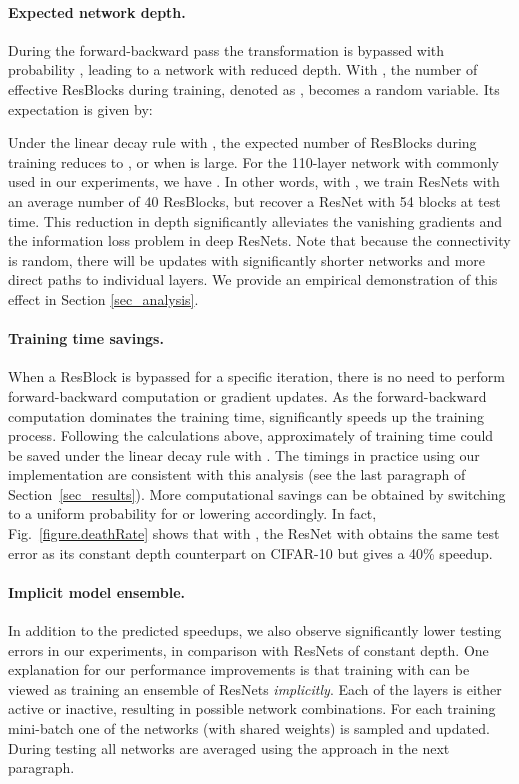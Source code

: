 \documentclass[runningheads]{llncs}
\begin{document}
\paragraph{\textbf{Expected network depth}.}
During the forward-backward pass the transformation  is bypassed with probability , leading to a network with reduced depth.
With \name{}, the number of effective ResBlocks during training, denoted as , becomes a random variable. Its expectation is given by:


Under the linear decay rule with , the expected number of ResBlocks during training reduces to , or  when  is large. For the 110-layer network with  commonly used in our experiments, we have . In other words, with \name{}, we train ResNets with an average number of 40 ResBlocks, but recover a ResNet with 54 blocks at test time.
This reduction in depth significantly alleviates the vanishing gradients and the information loss problem in deep ResNets. Note that because the connectivity is random, there will be updates with significantly shorter networks and more direct paths to individual layers. We provide an empirical demonstration of this effect in Section \ref{sec_analysis}.

\paragraph{\textbf{Training time savings}.}
When a ResBlock is bypassed for a specific iteration, there is no need to perform forward-backward computation or gradient updates. As the forward-backward computation dominates the training time, \name{} significantly speeds up the training process. Following the calculations above, approximately  of training time could be saved under the linear decay rule with . The timings in practice using our implementation are consistent with this analysis (see the last paragraph of Section~\ref{sec_results}). More computational savings can be obtained by switching to a uniform probability for  or lowering  accordingly. In fact, Fig.~\ref{figure.deathRate} shows that with , the ResNet with \name{} obtains the same test error as its constant depth counterpart on CIFAR-10 but gives a 40\% speedup.

\paragraph{\textbf{Implicit model ensemble}.}
In addition to the predicted speedups, we also observe significantly lower testing errors in our experiments, in comparison with ResNets of constant depth.
One explanation for our performance improvements is that training with \name{} can be viewed as training an ensemble of ResNets \emph{implicitly}.
Each of the  layers is either active or inactive, resulting in  possible network combinations. For each training mini-batch one of the  networks (with shared weights) is sampled and updated. During testing all networks are averaged using the approach in the next paragraph.
\end{document}
